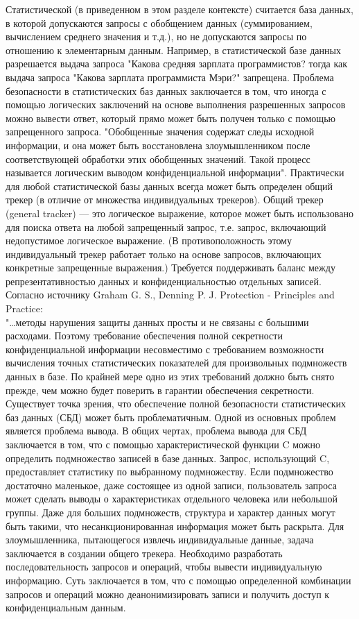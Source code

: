 Статистической (в приведенном в этом разделе контексте) считается база данных, в которой допускаются запросы с обобщением данных (суммированием, вычислением среднего значения и т.д.), но не допускаются запросы по отношению к элементарным данным. Например, в статистической базе данных разрешается выдача запроса "Какова средняя зарплата программистов? тогда как выдача запроса "Какова зарплата программиста Мэри?" запрещена. Проблема безопасности в статистических баз данных заключается в том, что иногда с помощью логических заключений на основе выполнения разрешенных запросов можно вывести ответ, который прямо может быть получен только с помощью запрещенного запроса. "Обобщенные значения содержат следы исходной информации, и она может быть восстановлена злоумышленником после соответствующей обработки этих обобщенных значений. Такой процесс называется логическим выводом конфиденциальной информации". Практически для любой статистической базы данных всегда может быть определен общий трекер (в отличие от множества индивидуальных трекеров). Общий трекер (general tracker) — это логическое выражение, которое может быть использовано для поиска ответа на любой запрещенный запрос, т.е. запрос, включающий недопустимое логическое выражение. (В противоположность этому индивидуальный трекер работает только на основе запросов, включающих конкретные запрещенные выражения.) Требуется поддерживать баланс между репрезентативностью данных и конфиденциальностью отдельных записей. 
\\

Согласно источнику Graham G. S., Denning P. J. Protection - Principles and Practice:
\\

"…методы нарушения защиты данных просты и не связаны с большими расходами. Поэтому требование обеспечения полной секретности конфиденциальной информации несовместимо с требованием возможности вычисления точных статистических показателей для произвольных подмножеств данных в базе. По крайней мере одно из этих требований должно быть снято прежде, чем можно будет поверить в гарантии обеспечения секретности.
\\

Существует точка зрения, что обеспечение полной безопасности статистических баз данных (СБД) может быть проблематичным. Одной из основных проблем является проблема вывода. В общих чертах, проблема вывода для СБД заключается в том, что с помощью характеристической функции C можно определить подмножество записей в базе данных. Запрос, использующий C, предоставляет статистику по выбранному подмножеству. Если подмножество достаточно маленькое, даже состоящее из одной записи, пользователь запроса может сделать выводы о характеристиках отдельного человека или небольшой группы. Даже для больших подмножеств, структура и характер данных могут быть такими, что несанкционированная информация может быть раскрыта. Для злоумышленника, пытающегося извлечь индивидуальные данные, задача заключается в создании общего трекера. Необходимо разработать последовательность запросов и операций, чтобы вывести индивидуальную информацию. Суть заключается в том, что с помощью определенной комбинации запросов и операций можно деанонимизировать записи и получить доступ к конфиденциальным данным.
\\

